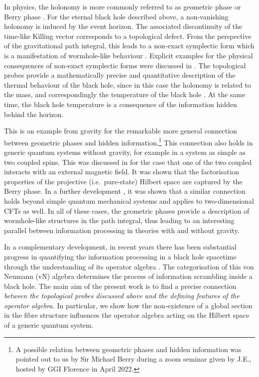 \documentclass[a4paper,11pt]{article}
\newcommand{\1}{\mathds{1}}
\begin{document}
In physics, the holonomy is more commonly referred to as geometric phase or Berry phase \cite{Berry:1984jv,Simon:1983mh}. For the eternal black hole described above, a non-vanishing holonomy is induced by the event horizon. The associated discontinuity of the time-like Killing vector corresponds to a topological defect. From the perspective of the gravitational path integral, this leads to a non-exact symplectic form which is a manifestation of wormhole-like behaviour \cite{Verlinde:2021kgt}. Explicit examples for the physical consequences of non-exact symplectic forms were discussed in \cite{Nogueira:2021ngh,Banerjee:2022jnv}. The topological probes provide a mathematically precise and quantitative description of the thermal behaviour of the black hole, since in this case the holonomy is related to the mass, and correspondingly the temperature of the black hole \cite{Sheikh-Jabbari:2016unm}. At the same time, the black hole temperature is a consequence of the information hidden behind the horizon.

This is an example from gravity for the remarkable more general connection between geometric phases and hidden information.\footnote{A possible relation between geometric phases and hidden information was pointed out to us by Sir Michael Berry during a zoom seminar given by J.E., hosted by GGI Florence in April 2022.} This connection also holds in generic quantum systems without gravity, for example in a system as simple as two coupled spins. This was discussed in \cite{Nogueira:2021ngh} for the case that one of the two coupled interacts with an external magnetic field. It was shown that the factorisation properties of the projective (i.e.~pure-state) Hilbert space are captured by the Berry phase. In a further development \cite{Banerjee:2022jnv}, it was shown that a similar connection holds beyond simple quantum mechanical systems and applies to two-dimensional CFTs as well. In all of these cases, the geometric phases provide a description of wormhole-like structures in the path integral, thus leading to an interesting parallel between information processing in theories with and without gravity. 

In a complementary development, in recent years there has been substantial progress in quantifying the information processing in a black hole spacetime through the understanding of its operator algebra \cite{Leutheusser:2021qhd,Leutheusser:2021frk,Witten:2021unn,Furuya:2023fei}. The categorisation of this von Neumann (vN) algebra determines the process of information scrambling inside a black hole. The main aim of the present work is to find a precise connection {\it between the topological probes discussed above and the defining features of the operator algebra.} In particular, we show how the non-existence of a global section in the fibre structure influences the operator algebra acting on the Hilbert space of a generic quantum system.
\end{document}
